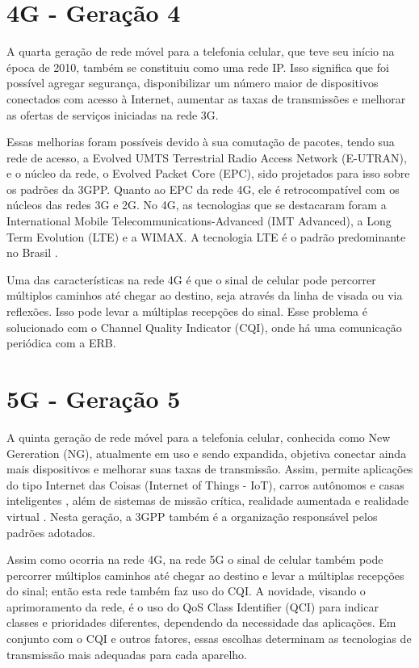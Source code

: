 \documentclass[11pt,oneside,a4paper]{abntex2}
\begin{document}
\section*{4G - Geração 4}
\label{4g}

A quarta geração de rede móvel para a telefonia celular, que teve seu início na época de 2010, também se constituiu como uma rede IP. Isso significa que foi possível agregar segurança, disponibilizar um número maior de dispositivos conectados com acesso à Internet, aumentar as taxas de transmissões e melhorar as ofertas de serviços iniciadas na rede 3G.

Essas melhorias foram possíveis devido à sua comutação de pacotes, tendo sua rede de acesso, a Evolved UMTS Terrestrial Radio Access Network (E-UTRAN), e o núcleo da rede, o Evolved Packet Core (EPC), sido projetados para isso sobre os padrões da 3GPP. Quanto ao EPC da rede 4G, ele é retrocompatível com os núcleos das redes 3G e 2G. No 4G, as tecnologias que se destacaram foram a International Mobile Telecommunications-Advanced (IMT Advanced), a Long Term Evolution (LTE) \cite{aula5} e a WIMAX. A tecnologia LTE é o padrão predominante no Brasil \cite{tcc2}.

Uma das características na rede 4G é que o sinal de celular pode percorrer múltiplos caminhos até chegar ao destino, seja através da linha de visada ou via reflexões. Isso pode levar a múltiplas recepções do sinal. Esse problema é solucionado com o Channel Quality Indicator (CQI), onde há uma comunicação periódica com a ERB.

\section*{5G - Geração 5}
\label{5g}

A quinta geração de rede móvel para a telefonia celular, conhecida como New Gereration (NG), atualmente em uso e sendo expandida, objetiva conectar ainda mais dispositivos e melhorar suas taxas de transmissão. Assim, permite aplicações do tipo Internet das Coisas (Internet of Things - IoT), carros autônomos e casas inteligentes \cite{tcc2}, além de sistemas de missão crítica, realidade aumentada e realidade virtual \cite{aula6}. Nesta geração, a 3GPP também é a organização responsável pelos padrões adotados.

Assim como ocorria na rede 4G, na rede 5G o sinal de celular também pode percorrer múltiplos caminhos até chegar ao destino e levar a múltiplas recepções do sinal; então esta rede também faz uso do CQI. A novidade, visando o aprimoramento da rede, é o uso do QoS Class Identifier (QCI) para indicar classes e prioridades diferentes, dependendo da
necessidade das aplicações. Em conjunto com o CQI e outros fatores,  essas escolhas determinam as tecnologias de transmissão mais adequadas para cada aparelho.
\end{document}
